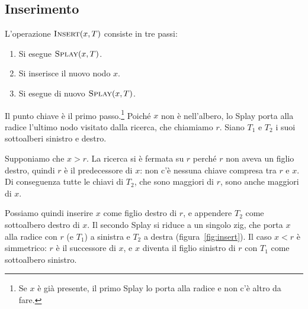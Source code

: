 \subsection{Inserimento}
L'operazione $\textsc{Insert}(x,T)$ consiste in tre passi:
\begin{enumerate}
    \item Si esegue $\textsc{Splay}(x,T)$.
    \item Si inserisce il nuovo nodo $x$.
    \item Si esegue di nuovo $\textsc{Splay}(x,T)$.
\end{enumerate}
Il punto chiave è il primo passo.\footnote{Se $x$ è già presente, il primo Splay lo porta alla radice e non c'è altro da fare.} Poiché $x$ non è nell'albero, lo Splay porta alla radice l'ultimo nodo visitato dalla ricerca, che chiamiamo $r$. Siano $T_1$ e $T_2$ i suoi sottoalberi sinistro e destro.

Supponiamo che $x > r$. La ricerca si è fermata su $r$ perché $r$ non aveva un figlio destro, quindi $r$ è il predecessore di $x$: non c'è nessuna chiave compresa tra $r$ e $x$. Di conseguenza tutte le chiavi di $T_2$, che sono maggiori di $r$, sono anche maggiori di $x$.

Possiamo quindi inserire $x$ come figlio destro di $r$, e appendere $T_2$ come sottoalbero destro di $x$. Il secondo Splay si riduce a un singolo zig, che porta $x$ alla radice con $r$ (e $T_1$) a sinistra e $T_2$ a destra (figura~\ref{fig:insert}). Il caso $x < r$ è simmetrico: $r$ è il successore di $x$, e $x$ diventa il figlio sinistro di $r$ con $T_1$ come sottoalbero sinistro.

